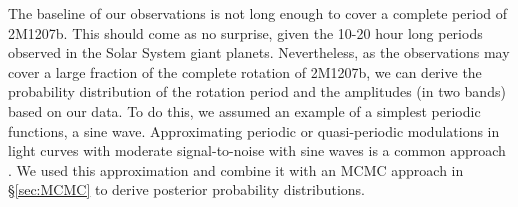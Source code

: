 \documentclass[apj]{emulateapj}
\newcommand{\bpic}{$\beta$ Pic}
\newcommand{\vsini}{$v\sin i$}
\newcommand{\reviseTwo}[1]{\textbf{{\color{cyan}{#1}}}}
\renewcommand{\reviseTwo}{}
\begin{document}
\reviseTwo{The baseline of our observations is not long enough to
  cover a complete period of 2M1207b. This should come as no surprise,
  given the 10-20 hour long periods observed in the Solar System giant
  planets. Nevertheless, as the observations may cover a large
  fraction of the complete rotation of 2M1207b, we can derive the
  probability distribution of the rotation period and the amplitudes
  (in two bands) based on our data. To do this, we assumed an example
  of a simplest periodic functions, a sine wave. Approximating
  periodic or quasi-periodic modulations in light curves with moderate
  signal-to-noise with sine waves is a common approach \citep[e.g.][]{Buenzli2012}.  We
  used this approximation and combine it with an MCMC approach in
  \S\ref{sec:MCMC} to derive posterior probability distributions.}
\end{document}
